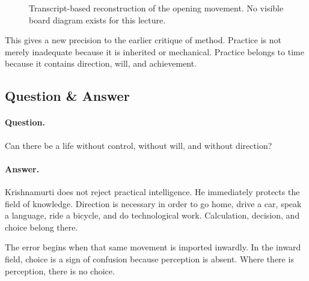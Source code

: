 \documentclass[11pt,oneside]{book}
\begin{document}
\begin{figure}
\centering
{}
\caption{Transcript-based reconstruction of the opening movement. No visible board diagram exists for this lecture.}
\end{figure}

This gives a new precision to the earlier critique of method. Practice is not merely inadequate because it is inherited or mechanical. Practice belongs to time because it contains direction, will, and achievement.

\subsection{Question \& Answer}

\paragraph{Question.}
Can there be a life without control, without will, and without direction?

\paragraph{Answer.}
Krishnamurti does not reject practical intelligence. He immediately protects the field of knowledge. Direction is necessary in order to go home, drive a car, speak a language, ride a bicycle, and do technological work. Calculation, decision, and choice belong there.

The error begins when that same movement is imported inwardly. In the inward field, choice is a sign of confusion because perception is absent. Where there is perception, there is no choice.
\end{document}
